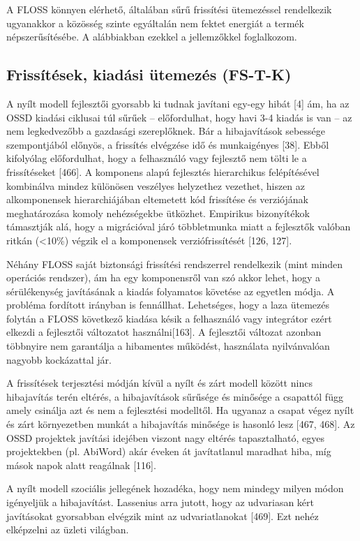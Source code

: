 \documentclass[12pt,magyar,a4paper,oneside]{scrreprt}
\begin{document}
A FLOSS könnyen elérhető, általában sűrű frissítési ütemezéssel
rendelkezik ugyanakkor a közösség szinte egyáltalán nem fektet energiát
a termék népszerűsítésébe. A alábbiakban ezekkel a jellemzőkkel
foglalkozom.

\hypertarget{sec:FS-T-K}{%
\subsection{Frissítések, kiadási ütemezés (FS-T-K)}\label{sec:FS-T-K}}

A nyílt modell fejlesztői gyorsabb ki tudnak javítani egy-egy hibát
{[}4{]} ám, ha az OSSD kiadási ciklusai túl sűrűek -- előfordulhat, hogy
havi 3-4 kiadás is van -- az nem legkedvezőbb a gazdasági szereplőknek.
Bár a hibajavítások sebessége szempontjából előnyös, a frissítés
elvégzése idő és munkaigényes {[}38{]}. Ebből kifolyólag előfordulhat,
hogy a felhasználó vagy fejlesztő nem tölti le a frissítéseket
{[}466{]}. A komponens alapú fejlesztés hierarchikus felépítésével
kombinálva mindez különösen veszélyes helyzethez vezethet, hiszen az
alkomponensek hierarchiájában eltemetett kód frissítése és verziójának
meghatározása komoly nehézségekbe ütközhet. Empirikus bizonyítékok
támasztják alá, hogy a migrációval járó többletmunka miatt a fejlesztők
valóban ritkán (\textless10\%) végzik el a komponensek verziófrissítését
{[}126, 127{]}.

Néhány FLOSS saját biztonsági frissítési rendszerrel rendelkezik (mint
minden operációs rendszer), ám ha egy komponensről van szó akkor lehet,
hogy a sérülékenység javításának a kiadás folyamatos követése az
egyetlen módja. A probléma fordított irányban is fennállhat. Lehetséges,
hogy a laza ütemezés folytán a FLOSS következő kiadása késik a
felhasználó vagy integrátor ezért elkezdi a fejlesztői változatot
használni{[}163{]}. A fejlesztői változat azonban többnyire nem
garantálja a hibamentes működést, használata nyilvánvalóan nagyobb
kockázattal jár.

A frissítések terjesztési módján kívül a nyílt és zárt modell között
nincs hibajavítás terén eltérés, a hibajavítások sűrűsége és minősége a
csapattól függ amely csinálja azt és nem a fejlesztési modelltől. Ha
ugyanaz a csapat végez nyílt és zárt környezetben munkát a hibajavítás
minősége is hasonló lesz {[}467, 468{]}. Az OSSD projektek javítási
idejében viszont nagy eltérés tapasztalható, egyes projektekben (pl.
AbiWord) akár éveken át javítatlanul maradhat hiba, míg mások napok
alatt reagálnak {[}116{]}.

A nyílt modell szociális jellegének hozadéka, hogy nem mindegy milyen
módon igényeljük a hibajavítást. Lassenius arra jutott, hogy az
udvariasan kért javításokat gyorsabban elvégzik mint az udvariatlanokat
{[}469{]}. Ezt nehéz elképzelni az üzleti világban.
\end{document}
